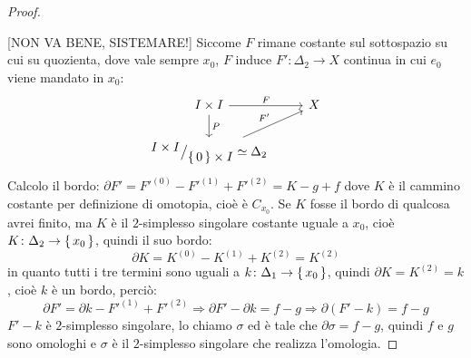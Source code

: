 \begin{proof}
\begin{figure}[htb]
\begin{subfigure}[t]{1.0\linewidth}
      \label{fig:lez3:homotopy_f_g_to_triangle}
    \end{subfigure}
  \end{figure}
  [NON VA BENE, SISTEMARE!]
  Siccome $ F $ rimane costante sul sottospazio su cui su quozienta,
  dove vale sempre $ x_0 $,
  $ F $ induce $ F' \colon \Delta_2 \to X $ continua in cui $ e_0 $ viene mandato in $ x_0 $:
  \[
    \begin{tikzcd}
      I \times I \arrow{r}{F} \arrow{d}{P} & X \\
      \quot{I \times I}{\set{0} \times I} \simeq \Delta_2 \arrow{ur}{F'}
    \end{tikzcd}
  \]
  Calcolo il bordo: $ \partial F' = F'^{(0)} - F'^{(1)} + F'^{(2)} = K - g + f $
  dove $ K $ è il cammino costante per definizione di omotopia, cioè è
  $ C_{x_0}$. Se $ K $ fosse il bordo di qualcosa avrei finito, ma $ K $ è il
  $ 2 $-simplesso singolare costante uguale a $ x_0 $, cioè
  $ K \colon \Delta_2 \to \set{x_0} $, quindi il suo bordo:
  \[
    \partial K = K^{(0)} - K^{(1)} + K^{(2)} =  K^{(2)}
  \]
  in quanto tutti i tre termini sono uguali a $ k \colon \Delta_1 \to \set{x_0} $, quindi $ \partial K = K^{(2)} = k $,
  cioè $ k $ è un bordo, perciò:
  \[
    \partial F' = \partial k - F'^{(1)} + F'^{(2)} \Rightarrow \partial F' - \partial k = f - g \Rightarrow \partial(F' - k) = f - g
  \]
  $ F' - k $ è $ 2 $-simplesso singolare, lo chiamo $ \sigma $ ed è tale che $ \partial \sigma = f - g $, quindi
  $ f $ e $ g $ sono omologhi e $ \sigma $ è il $ 2 $-simplesso singolare che realizza
  l'omologia.
\end{proof}

